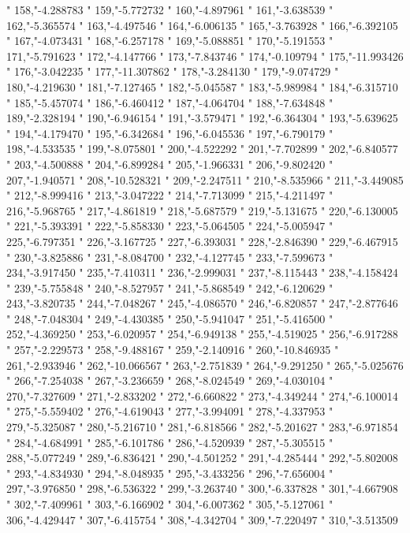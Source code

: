 "
158,"-4.288783
"
159,"-5.772732
"
160,"-4.897961
"
161,"-3.638539
"
162,"-5.365574
"
163,"-4.497546
"
164,"-6.006135
"
165,"-3.763928
"
166,"-6.392105
"
167,"-4.073431
"
168,"-6.257178
"
169,"-5.088851
"
170,"-5.191553
"
171,"-5.791623
"
172,"-4.147766
"
173,"-7.843746
"
174,"-0.109794
"
175,"-11.993426
"
176,"-3.042235
"
177,"-11.307862
"
178,"-3.284130
"
179,"-9.074729
"
180,"-4.219630
"
181,"-7.127465
"
182,"-5.045587
"
183,"-5.989984
"
184,"-6.315710
"
185,"-5.457074
"
186,"-6.460412
"
187,"-4.064704
"
188,"-7.634848
"
189,"-2.328194
"
190,"-6.946154
"
191,"-3.579471
"
192,"-6.364304
"
193,"-5.639625
"
194,"-4.179470
"
195,"-6.342684
"
196,"-6.045536
"
197,"-6.790179
"
198,"-4.533535
"
199,"-8.075801
"
200,"-4.522292
"
201,"-7.702899
"
202,"-6.840577
"
203,"-4.500888
"
204,"-6.899284
"
205,"-1.966331
"
206,"-9.802420
"
207,"-1.940571
"
208,"-10.528321
"
209,"-2.247511
"
210,"-8.535966
"
211,"-3.449085
"
212,"-8.999416
"
213,"-3.047222
"
214,"-7.713099
"
215,"-4.211497
"
216,"-5.968765
"
217,"-4.861819
"
218,"-5.687579
"
219,"-5.131675
"
220,"-6.130005
"
221,"-5.393391
"
222,"-5.858330
"
223,"-5.064505
"
224,"-5.005947
"
225,"-6.797351
"
226,"-3.167725
"
227,"-6.393031
"
228,"-2.846390
"
229,"-6.467915
"
230,"-3.825886
"
231,"-8.084700
"
232,"-4.127745
"
233,"-7.599673
"
234,"-3.917450
"
235,"-7.410311
"
236,"-2.999031
"
237,"-8.115443
"
238,"-4.158424
"
239,"-5.755848
"
240,"-8.527957
"
241,"-5.868549
"
242,"-6.120629
"
243,"-3.820735
"
244,"-7.048267
"
245,"-4.086570
"
246,"-6.820857
"
247,"-2.877646
"
248,"-7.048304
"
249,"-4.430385
"
250,"-5.941047
"
251,"-5.416500
"
252,"-4.369250
"
253,"-6.020957
"
254,"-6.949138
"
255,"-4.519025
"
256,"-6.917288
"
257,"-2.229573
"
258,"-9.488167
"
259,"-2.140916
"
260,"-10.846935
"
261,"-2.933946
"
262,"-10.066567
"
263,"-2.751839
"
264,"-9.291250
"
265,"-5.025676
"
266,"-7.254038
"
267,"-3.236659
"
268,"-8.024549
"
269,"-4.030104
"
270,"-7.327609
"
271,"-2.833202
"
272,"-6.660822
"
273,"-4.349244
"
274,"-6.100014
"
275,"-5.559402
"
276,"-4.619043
"
277,"-3.994091
"
278,"-4.337953
"
279,"-5.325087
"
280,"-5.216710
"
281,"-6.818566
"
282,"-5.201627
"
283,"-6.971854
"
284,"-4.684991
"
285,"-6.101786
"
286,"-4.520939
"
287,"-5.305515
"
288,"-5.077249
"
289,"-6.836421
"
290,"-4.501252
"
291,"-4.285444
"
292,"-5.802008
"
293,"-4.834930
"
294,"-8.048935
"
295,"-3.433256
"
296,"-7.656004
"
297,"-3.976850
"
298,"-6.536322
"
299,"-3.263740
"
300,"-6.337828
"
301,"-4.667908
"
302,"-7.409961
"
303,"-6.166902
"
304,"-6.007362
"
305,"-5.127061
"
306,"-4.429447
"
307,"-6.415754
"
308,"-4.342704
"
309,"-7.220497
"
310,"-3.513509
